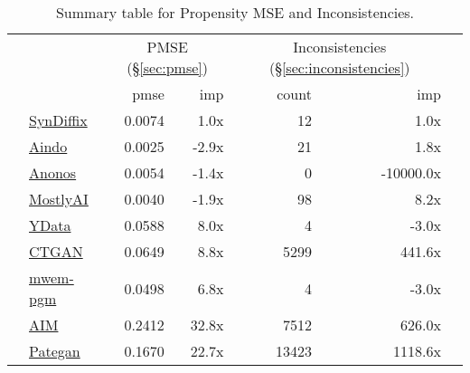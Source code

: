 \begin{table}
    \centering
    \caption{Summary table for Propensity MSE and Inconsistencies.}
    \label{tab:pmse}
    \begin{tabular}{llr@{\hskip 6pt}r@{\hskip 10pt}rrl}
        \toprule
          &   & \multicolumn{2}{c}{PMSE (\S\ref{sec:pmse})} & \multicolumn{2}{c}{Inconsistencies (\S\ref{sec:inconsistencies})} \\
        
 & & pmse & imp & count & imp \\
\midrule
        \cellcolor{blue} & \href{https://htmlpreview.github.io/?https://github.com/yoid2000/sdnist-summary/blob/main/results/syndiffix_all/report.html}{SynDiffix} & 0.0074 & 1.0x & 12 & 1.0x \\
        \cellcolor{red} & \href{https://htmlpreview.github.io/?https://github.com/yoid2000/sdnist-summary/blob/main/results/aindo_synth/report.html}{Aindo} & 0.0025 & -2.9x & 21 & 1.8x \\
        \cellcolor{red} & \href{https://htmlpreview.github.io/?https://github.com/yoid2000/sdnist-summary/blob/main/results/anonos_sdk/report.html}{Anonos} & 0.0054 & -1.4x & 0 & -10000.0x \\
        \cellcolor{red} & \href{https://htmlpreview.github.io/?https://github.com/yoid2000/sdnist-summary/blob/main/results/mostlyai_sd_platform/report.html}{MostlyAI} & 0.0040 & -1.9x & 98 & 8.2x \\
        \cellcolor{red} & \href{https://htmlpreview.github.io/?https://github.com/yoid2000/sdnist-summary/blob/main/results/ydata_fabric_synthesizers/report.html}{YData} & 0.0588 & 8.0x & 4 & -3.0x \\
        \cellcolor{red} & \href{https://htmlpreview.github.io/?https://github.com/yoid2000/sdnist-summary/blob/main/results/sdv_ctgan_epochs1000/report.html}{CTGAN} & 0.0649 & 8.8x & 5299 & 441.6x \\
        \cellcolor{ForestGreen} & \href{https://htmlpreview.github.io/?https://github.com/yoid2000/sdnist-summary/blob/main/results/mwem_pgm/report.html}{mwem-pgm} & 0.0498 & 6.8x & 4 & -3.0x \\
        \cellcolor{ForestGreen} & \href{https://htmlpreview.github.io/?https://github.com/yoid2000/sdnist-summary/blob/main/results/aim_e_10_all/report.html}{AIM} & 0.2412 & 32.8x & 7512 & 626.0x \\
        \cellcolor{ForestGreen} & \href{https://htmlpreview.github.io/?https://github.com/yoid2000/sdnist-summary/blob/main/results/pategan_n_iter_50_e_10_all/report.html}{Pategan} & 0.1670 & 22.7x & 13423 & 1118.6x \\

\end{tabular}
\end{table}
